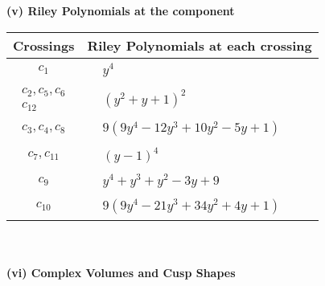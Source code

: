 \documentclass[1p]{elsarticle_modified}
\theoremstyle{definition}
\begin{document}
\newpage\renewcommand{\arraystretch}{1}
\flushleft \textbf{(v) Riley Polynomials at the component}\newline \\
\begin{tabular}{m{50pt}|m{274pt}}
Crossings & \hspace{64pt}Riley Polynomials at each crossing \\
\hline $$\begin{aligned}c_{1}\end{aligned}$$&$\begin{aligned}
&y^4
\end{aligned}$\\
\hline $$\begin{aligned}c_{2},c_{5},c_{6}\\c_{12}\end{aligned}$$&$\begin{aligned}
&(y^2+y+1)^2
\end{aligned}$\\
\hline $$\begin{aligned}c_{3},c_{4},c_{8}\end{aligned}$$&$\begin{aligned}
&9(9 y^4-12 y^3+10 y^2-5 y+1)
\end{aligned}$\\
\hline $$\begin{aligned}c_{7},c_{11}\end{aligned}$$&$\begin{aligned}
&(y-1)^4
\end{aligned}$\\
\hline $$\begin{aligned}c_{9}\end{aligned}$$&$\begin{aligned}
&y^4+y^3+y^2-3 y+9
\end{aligned}$\\
\hline $$\begin{aligned}c_{10}\end{aligned}$$&$\begin{aligned}
&9(9 y^4-21 y^3+34 y^2+4 y+1)
\end{aligned}$\\
\hline
\end{tabular}\\~\\
\newpage\flushleft \textbf{(vi) Complex Volumes and Cusp Shapes}
\end{document}
